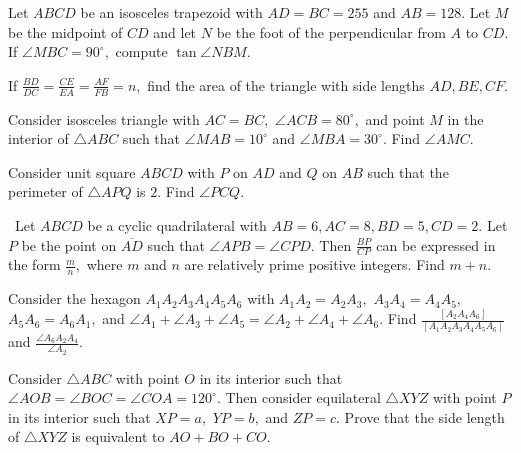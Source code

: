 \documentclass[mast]{lucky}
\begin{document}
    \begin{prob}[HMMT 2019]{6}
Let $ABCD$ be an isosceles trapezoid with $AD=BC= 255$ and $AB= 128.$ Let $M$ be the midpoint of $CD$ and let $N$ be the foot of the perpendicular from $A$ to $CD.$ If $\angle MBC= 90^{\circ},$ compute $\tan\angle NBM.$
\end{prob}
    
    \begin{prob}[]{6}
If $\frac{BD}{DC}=\frac{CE}{EA}=\frac{AF}{FB}=n,$ find the area of the triangle with side lengths $AD,BE,CF.$
\end{prob}

    \begin{prob}[China]{6}
Consider $\triangle BAC$ such that $\angle A=45^{\circ}.$ Let $H$ be the foot of the $A$ altitude. If $BH=2$ and $CH=3,$ find $[ABC].$}
\end{prob}

	 \begin{prob}[]{6}
     Consider isosceles triangle with $AC=BC,$ $\angle ACB=80^{\circ},$ and point $M$ in the interior of $\triangle ABC$ such that $\angle MAB=10^{\circ}$ and $\angle MBA=30^{\circ}.$ Find $\angle AMC.$
\end{prob}
    
    \begin{prob}[]{6}
 Consider unit square $ABCD$ with $P$ on $AD$ and $Q$ on $AB$ such that the perimeter of $\triangle APQ$ is $2.$ Find $\angle PCQ.$
\end{prob}

    \begin{prob}[CIME 2020]{9}
\ Let $ABCD$ be a cyclic quadrilateral with $AB=6,AC=8,BD=5,CD=2.$ Let $P$ be the point on $\overline{AD}$ such that $\angle APB=\angle CPD.$ Then $\frac{BP}{CP}$ can be expressed in the form $\frac{m}{n},$ where $m$ and $n$ are relatively prime positive integers. Find $m+n.$
\end{prob}
    
    \begin{prob}[]{9}
Consider the hexagon $A_1A_2A_3A_4A_5A_6$ with $A_1A_2=A_2A_3,$ $A_3A_4=A_4A_5,$ $A_5A_6=A_6A_1,$ and $\angle A_1+\angle A_3+\angle A_5 = \angle A_2+\angle A_4+\angle A_6.$ Find $\frac{[A_2A_4A_6]}{[A_1A_2A_3A_4A_5A_6]}$ and $\frac{\angle A_6A_2A_4}{\angle A_2}.$
\end{prob}
    
	 \begin{prob}[]{9}
     Consider $\triangle ABC$ with point $O$ in its interior such that $\angle AOB=\angle BOC=\angle COA=120^{\circ}.$ Then consider equilateral $\triangle XYZ$ with point $P$ in its interior such that $XP=a,$ $YP=b,$ and $ZP=c.$ Prove that the side length of $\triangle XYZ$ is equivalent to $AO+BO+CO.$
    \end{prob}
    
\end{document}
